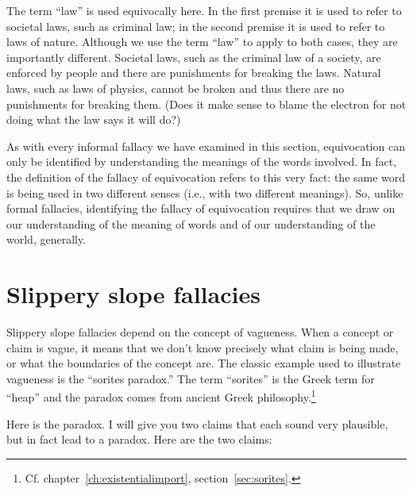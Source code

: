 \begin{kormanize}
\end{kormanize}

The term ``law'' is used equivocally here. In the first premise it is used to refer to societal laws, such as criminal law; in the second premise it is used to refer to laws of nature. Although we use the term ``law'' to apply to both cases, they are importantly different. Societal laws, such as the criminal law of a society, are enforced by people and there are punishments for breaking the laws. Natural laws, such as laws of physics, cannot be broken and thus there are no punishments for breaking them. (Does it make sense to blame the electron for not doing what the law says it will do?)

As with every informal fallacy we have examined in this section, equivocation can only be identified by understanding the meanings of the words involved. In fact, the definition of the fallacy of equivocation refers to this very fact: the same word is being used in two different senses (i.e., with two different meanings). So,
unlike formal fallacies, identifying the fallacy of equivocation requires that we draw on our understanding of the meaning of words and of our understanding of the world, generally.

\section{Slippery slope fallacies}\label{sec:slipperyslope}

Slippery slope fallacies depend on the concept of vagueness. When a concept or claim is vague, it means that we don't know precisely what claim is being made, or what the boundaries of the concept are. The classic example used to illustrate vagueness is the ``sorites paradox.'' The term ``sorites'' is the Greek term for ``heap'' and the paradox comes from ancient Greek philosophy.\footnote{Cf. chapter~\ref{ch:existentialimport}, section~\ref{sec:sorites}.}

Here is the paradox. I will give you two claims that each sound very plausible, but in fact lead to a paradox. Here are the two claims:
\begin{kormanize}
\end{kormanize}

